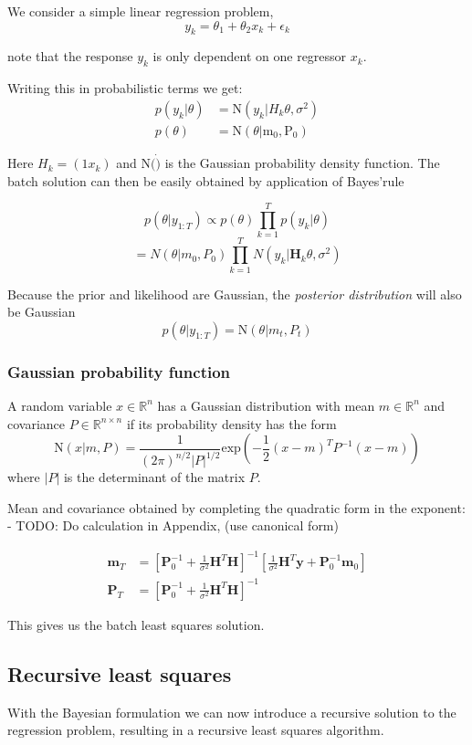 We consider a simple linear regression problem,
$$ y_k = \theta_1 + \theta_2 x_k + \epsilon_k $$

note that the response $y_k$ is only dependent on one regressor $x_k$.

Writing this in probabilistic terms we get:
\begin{align}
  p(y_k | \theta) &= \text{N}(y_k | H_k \theta, \sigma^2) \\
  p(\theta) &= \text{N}(\theta | \text{m}_0, \text{P}_0)
\end{align}

Here $H_k = (1 x_k)$ and N$(\dot)$ is the Gaussian probability density function.
The batch solution can then be easily obtained by application of Bayes'rule

$$ p(\theta | y_{1:T})  \propto p(\theta) \prod^T_{k=1} p (y_k | \theta) $$
$$ = N(\theta | m_0, P_0) \prod^T_{k=1} N(y_k | \textbf{H}_k \theta, \sigma^2) $$

Because the prior and likelihood are Gaussian, the \textit{posterior distribution}
will also be Gaussian
$$ p(\theta | y_{1:T}) = \text{N}(\theta | m_t, P_t) $$

\subsubsection{Gaussian probability function}
A random variable $x \in \mathbb{R}^n$ has a Gaussian distribution with mean
$m \in \mathbb{R}^n$ and covariance $P \in \mathbb{R}^{n\times n}$ if its
probability density has the form
$$ \text{N}(x | m, P) = \frac{1}{(2\pi)^{n / 2} |P|^{1/2}}
\text{exp} \left( -\frac{1}{2} (x - m)^T P^{-1} (x-m) \right) $$
where $|P|$ is the determinant of the matrix $P$.

Mean and covariance obtained by completing the quadratic form in the exponent:
- TODO: Do calculation in Appendix, (use canonical form)

\begin{align}
  \mathbf{m}_T &= \left[ \mathbf{P}^{-1}_0 + \frac{1}{\sigma^2} \mathbf{H}^T \mathbf{H}
                 \right]^{-1} \left[\frac{1}{\sigma^2} \mathbf{H}^T \mathbf{y} +
  \mathbf{P}^{-1}_0 \mathbf{m}_0 \right] \\
  \mathbf{P}_T &= \left[\mathbf{P}_0^{-1} + \frac{1}{\sigma^2} \mathbf{H}^T \mathbf{H}
                 \right]^{-1}
\end{align}

This gives us the batch least squares solution.

\subsection{Recursive least squares} \label{RLS}
With the Bayesian formulation we can now  introduce a recursive
solution to the regression problem, resulting in a recursive least squares
algorithm.

